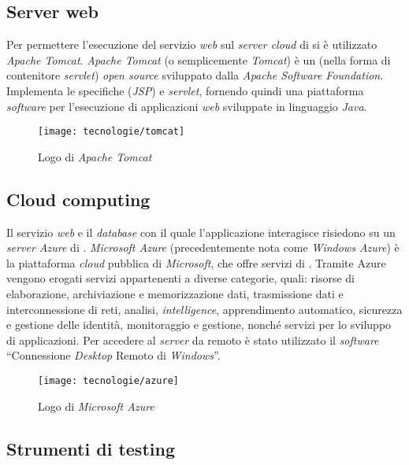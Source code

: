 \newpage

\subsection{Server web}

Per permettere l'esecuzione del servizio \textit{web} sul \textit{server cloud} di \visione{} si è utilizzato \textit{Apache Tomcat}. \textit{Apache Tomcat} (o semplicemente \textit{Tomcat}) è un  (nella forma di contenitore \textit{servlet}) \textit{open source} sviluppato dalla \textit{Apache Software Foundation}. Implementa le specifiche  (\textit{JSP}) e \textit{servlet}, fornendo quindi una piattaforma \textit{software} per l'esecuzione di applicazioni \textit{web} sviluppate in linguaggio \textit{Java}.

\begin{figure}[!h] 
    \centering 
    \texttt{[image: tecnologie/tomcat]} 
    \caption{Logo di \textit{Apache Tomcat}}
\end{figure}

\subsection{Cloud computing}

Il servizio \textit{web} e il \textit{database} con il quale l'applicazione interagisce risiedono su un \textit{server Azure} di \visione{}. \textit{Microsoft Azure} (precedentemente nota come \textit{Windows Azure}) è la piattaforma \textit{cloud} pubblica di \textit{Microsoft}, che offre servizi di . Tramite Azure vengono erogati servizi appartenenti a diverse categorie, quali: risorse di elaborazione, archiviazione e memorizzazione dati, trasmissione dati e interconnessione di reti, analisi, \textit{intelligence}, apprendimento automatico, sicurezza e gestione delle identità, monitoraggio e gestione, nonché servizi per lo sviluppo di applicazioni. Per accedere al \textit{server} da remoto è stato utilizzato il \textit{software} ``Connessione \textit{Desktop} Remoto di \textit{Windows}''.

\begin{figure}[!h] 
    \centering 
    \texttt{[image: tecnologie/azure]} 
    \caption{Logo di \textit{Microsoft Azure}}
\end{figure}

\newpage

\subsection{Strumenti di testing}

